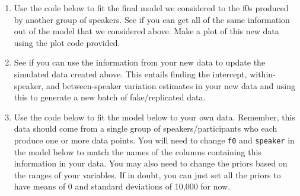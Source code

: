 \documentclass[
]{book}
\begin{document}
\begin{enumerate}
\def\labelenumi{\arabic{enumi})}
\item
  Use the code below to fit the final model we considered to the f0s produced by another group of speakers. See if you can get all of the same information out of the model that we considered above. Make a plot of this new data using the plot code provided.
\item
  See if you can use the information from your new data to update the simulated data created above. This entails finding the intercept, within-speaker, and between-speaker variation estimates in your new data and using this to generate a new batch of fake/replicated data.
\item
  Use the code below to fit the model below to your own data. Remember, this data should come from a single group of speakers/participants who each produce one or more data points. You will need to change \texttt{f0} and \texttt{speaker} in the model below to match the names of the columns containing this information in your data. You may also need to change the priors based on the ranges of your variables. If in doubt, you can just set all the priors to have means of 0 and standard deviations of 10,000 for now.
\end{enumerate}
\end{document}
